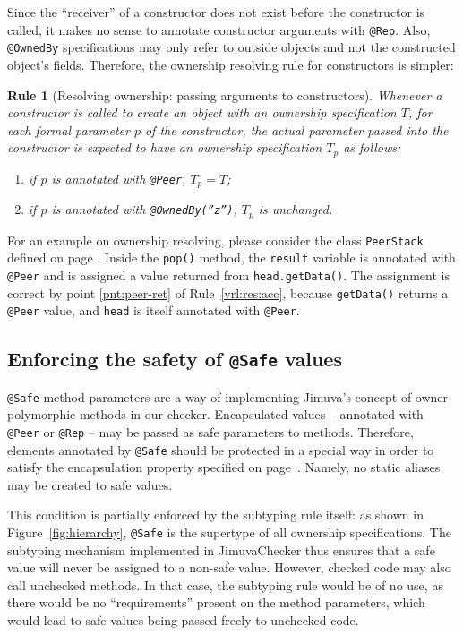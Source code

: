 \documentclass{pracamgr}
\theoremstyle{break}
\theoremstyle{break}
\theoremstyle{break}
\newtheorem{verrule}{Rule}
\begin{document}
Since the ``receiver'' of a constructor does not exist before the
constructor is called, it makes no sense to annotate constructor
arguments with \texttt{@Rep}. Also, \texttt{@OwnedBy} specifications
may only refer to outside objects and not the constructed object's
fields. Therefore, the ownership resolving rule for constructors is
simpler:

\begin{verrule}[Resolving ownership: passing arguments to constructors]
  Whenever a constructor is called to create an object with an
  ownership specification $T$, for each formal parameter $p$ of the
  constructor, the actual parameter passed into the constructor is
  expected to have an ownership specification $T_p$ as follows:
  \begin{enumerate}[label=(\arabic*)]
  \item if $p$ is annotated with \texttt{@Peer}, $T_p = T$;
  \item if $p$ is annotated with \texttt{@OwnedBy(''z'')}, $T_p$ is
    unchanged.
  \end{enumerate}
\end{verrule}

For an example on ownership resolving, please consider the class
\texttt{PeerStack} defined on page \pageref{lst:stack-peer}. Inside
the \texttt{pop()} method, the \texttt{result} variable is annotated
with \texttt{@Peer} and is assigned a value returned from
\texttt{head.getData()}. The assignment is correct by point
\ref{pnt:peer-ret} of Rule~\ref{vrl:res:acc}, because
\texttt{getData()} returns a \texttt{@Peer} value, and \texttt{head}
is itself annotated with \texttt{@Peer}.

\subsection{Enforcing the safety of \texttt{@Safe} values}
\label{sec:chk:safe}

\texttt{@Safe} method parameters are a way of implementing Jimuva's
concept of owner-polymorphic methods in our checker. Encapsulated
values -- annotated with \texttt{@Peer} or \texttt{@Rep} -- may be
passed as safe parameters to methods. Therefore, elements annotated by
\texttt{@Safe} should be protected in a special way in order to
satisfy the encapsulation property specified on
page~\pageref{inv:encap}. Namely, no static aliases may be created to
safe values.

This condition is partially enforced by the subtyping rule itself: as
shown in Figure~\ref{fig:hierarchy}, \texttt{@Safe} is the supertype
of all ownership specifications. The subtyping mechanism implemented
in JimuvaChecker thus ensures that a safe value will never be assigned
to a non-safe value. However, checked code may also call unchecked
methods. In that case, the subtyping rule would be of no use, as there
would be no ``requirements'' present on the method parameters, which
would lead to safe values being passed freely to unchecked code.
\end{document}
